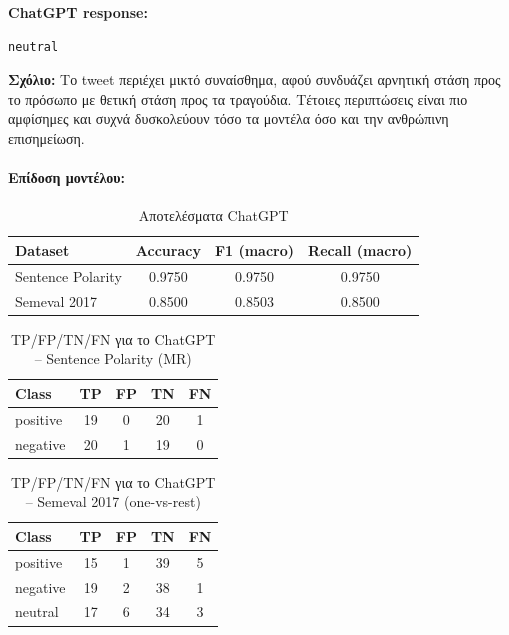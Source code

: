 \documentclass[11pt,a4paper]{article}
\begin{document}
\textbf{\textlatin{ChatGPT response:}}
\begin{verbatim}
neutral
\end{verbatim}

\textbf{Σχόλιο:} Το \textlatin{tweet} περιέχει μικτό συναίσθημα, αφού συνδυάζει αρνητική στάση προς το πρόσωπο με θετική στάση προς τα τραγούδια. Τέτοιες περιπτώσεις είναι πιο αμφίσημες και συχνά δυσκολεύουν τόσο τα μοντέλα όσο και την ανθρώπινη επισημείωση.

\paragraph{Επίδοση μοντέλου:}

\begin{table}[H]
  \centering
  \caption{Αποτελέσματα \textlatin{ChatGPT}}
  \begin{tabular}{lccc}
    \toprule
    \textbf{\textlatin{Dataset}} & \textbf{\textlatin{Accuracy}} & \textbf{\textlatin{F1 (macro)}} & \textbf{\textlatin{Recall (macro)}} \\
    \midrule
    \textlatin{Sentence Polarity} & 0.9750 & 0.9750 & 0.9750 \\
    \textlatin{Semeval 2017}      & 0.8500 & 0.8503 & 0.8500 \\
    \bottomrule
  \end{tabular}
\end{table}

\begin{table}[H]
  \centering
  \caption{\textlatin{TP/FP/TN/FN} για το \textlatin{ChatGPT} -- \textlatin{Sentence Polarity (MR)}}
  \begin{tabular}{lcccc}
    \toprule
    \textbf{\textlatin{Class}} & \textbf{\textlatin{TP}} & \textbf{\textlatin{FP}} & \textbf{\textlatin{TN}} & \textbf{\textlatin{FN}} \\
    \midrule
    \textlatin{positive} & 19 & 0 & 20 & 1 \\
    \textlatin{negative} & 20 & 1 & 19 & 0 \\
    \bottomrule
  \end{tabular}
\end{table}

\begin{table}[H]
  \centering
  \caption{\textlatin{TP/FP/TN/FN} για το \textlatin{ChatGPT} -- \textlatin{Semeval 2017} (\textlatin{one-vs-rest})}
  \begin{tabular}{lcccc}
    \toprule
    \textbf{\textlatin{Class}} & \textbf{\textlatin{TP}} & \textbf{\textlatin{FP}} & \textbf{\textlatin{TN}} & \textbf{\textlatin{FN}} \\
    \midrule
    \textlatin{positive} & 15 & 1 & 39 & 5 \\
    \textlatin{negative} & 19 & 2 & 38 & 1 \\
    \textlatin{neutral}  & 17 & 6 & 34 & 3 \\
    \bottomrule
  \end{tabular}
\end{table}
\end{document}

